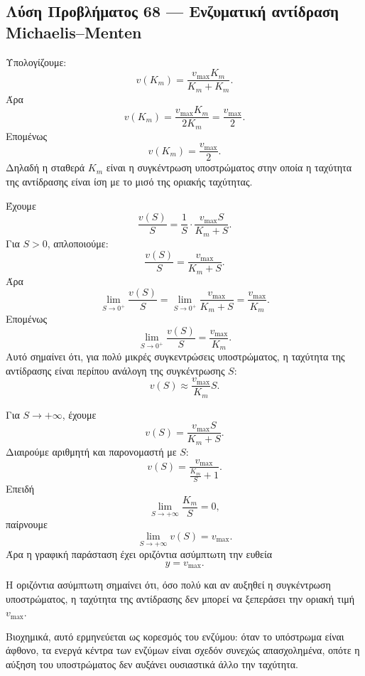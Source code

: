 \subsection*{Λύση Προβλήματος 68 --- Ενζυματική αντίδραση Michaelis--Menten}

\begin{alist}
  \item Υπολογίζουμε:
        \[
          v(K_m)=\frac{v_{\max}K_m}{K_m+K_m}.
        \]
        Άρα
        \[
          v(K_m)=\frac{v_{\max}K_m}{2K_m}
          =
          \frac{v_{\max}}{2}.
        \]
        Επομένως
        \[
          {v(K_m)=\frac{v_{\max}}{2}}.
        \]
        Δηλαδή η σταθερά \(K_m\) είναι η συγκέντρωση υποστρώματος στην
        οποία η ταχύτητα της αντίδρασης είναι ίση με το μισό της
        οριακής ταχύτητας.

  \item Έχουμε
        \[
          \frac{v(S)}{S}
          =
          \frac{1}{S}\cdot\frac{v_{\max}S}{K_m+S}.
        \]
        Για \(S>0\), απλοποιούμε:
        \[
          \frac{v(S)}{S}
          =
          \frac{v_{\max}}{K_m+S}.
        \]
        Άρα
        \[
          \lim_{S\to0^+}\frac{v(S)}{S}
          =
          \lim_{S\to0^+}\frac{v_{\max}}{K_m+S}
          =
          \frac{v_{\max}}{K_m}.
        \]
        Επομένως
        \[
          {
          \lim_{S\to0^+}\frac{v(S)}{S}
          =
          \frac{v_{\max}}{K_m}
          }.
        \]
        Αυτό σημαίνει ότι, για πολύ μικρές συγκεντρώσεις υποστρώματος,
        η ταχύτητα της αντίδρασης είναι περίπου ανάλογη της
        συγκέντρωσης \(S\):
        \[
          v(S)\approx\frac{v_{\max}}{K_m}S.
        \]

  \item Για \(S\to+\infty\), έχουμε
        \[
          v(S)=\frac{v_{\max}S}{K_m+S}.
        \]
        Διαιρούμε αριθμητή και παρονομαστή με \(S\):
        \[
          v(S)=\frac{v_{\max}}{\frac{K_m}{S}+1}.
        \]
        Επειδή
        \[
          \lim_{S\to+\infty}\frac{K_m}{S}=0,
        \]
        παίρνουμε
        \[
          {
          \lim_{S\to+\infty}v(S)=v_{\max}
          }.
        \]
        Άρα η γραφική παράσταση έχει οριζόντια ασύμπτωτη την ευθεία
        \[
          {y=v_{\max}}.
        \]

  \item Η οριζόντια ασύμπτωτη σημαίνει ότι, όσο πολύ και αν αυξηθεί η
        συγκέντρωση υποστρώματος, η ταχύτητα της αντίδρασης δεν μπορεί
        να ξεπεράσει την οριακή τιμή \(v_{\max}\).

        Βιοχημικά, αυτό ερμηνεύεται ως κορεσμός του ενζύμου: όταν το
        υπόστρωμα είναι άφθονο, τα ενεργά κέντρα των ενζύμων είναι
        σχεδόν συνεχώς απασχολημένα, οπότε η αύξηση του υποστρώματος
        δεν αυξάνει ουσιαστικά άλλο την ταχύτητα.
\end{alist}

